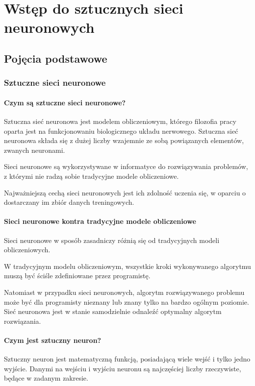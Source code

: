 \chapter{Wstęp do sztucznych sieci neuronowych}
\section{Pojęcia podstawowe}
\subsection{Sztuczne sieci neuronowe}
\subsubsection{Czym są sztuczne sieci neuronowe?}
Sztuczna sieć neuronowa jest modelem obliczeniowym, którego filozofia pracy oparta jest na funkcjonowaniu biologicznego układu nerwowego.
Sztuczna sieć neuronowa składa się z dużej liczby wzajemnie ze sobą powiązanych elementów, zwanych neuronami.

Sieci neuronowe są wykorzystywane w informatyce do rozwiązywania problemów, z którymi nie radzą sobie tradycyjne modele obliczeniowe.

Najważniejszą cechą sieci neuronowych jest ich zdolność uczenia się, w oparciu o dostarczany im zbiór danych treningowych.

\subsubsection{Sieci neuronowe kontra tradycyjne modele obliczeniowe}
Sieci neuronowe w sposób zasadniczy różnią się od tradycyjnych modeli obliczeniowych.
 
W tradycyjnym modelu obliczeniowym, wszystkie kroki wykonywanego algorytmu muszą być ściśle zdefiniowane przez programistę.

Natomiast w przypadku sieci neuronowych, algorytm rozwiązywanego problemu może być dla programisty nieznany lub znany tylko na bardzo ogólnym poziomie.
Sieć neuronowa jest w stanie samodzielnie odnaleźć optymalny algorytm rozwiązania.

\subsubsection{Czym jest sztuczny neuron?}
Sztuczny neuron jest matematyczną funkcją, posiadającą wiele wejść i tylko jedno wyjście. Danymi na wejściu i wyjściu neuronu są najczęściej liczby rzeczywiste, będące  w zadanym zakresie.

